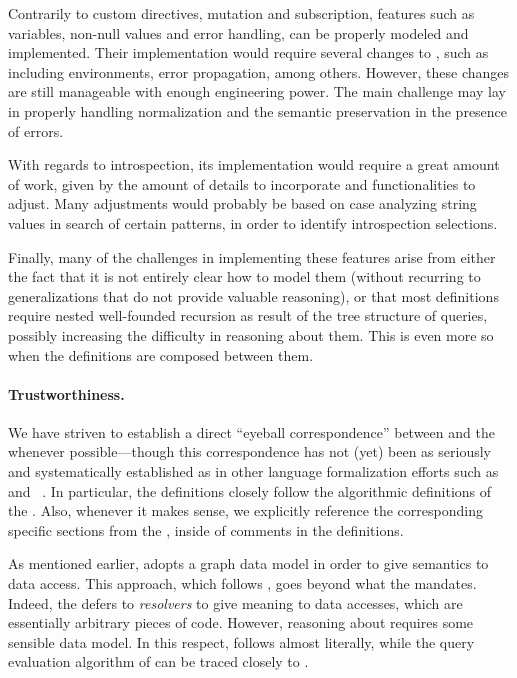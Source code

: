 Contrarily to custom directives, mutation and subscription, features such as variables, non-null values and error handling, can be properly modeled and implemented.
Their implementation would require several changes to \gcoql, such as including environments, error propagation, among others. 
However, these changes are still manageable with enough engineering power. 
The main challenge may lay in properly handling normalization and the semantic preservation in the presence of errors.

With regards to introspection, its implementation would require a great amount of work, given by the amount
of details to incorporate and functionalities to adjust. Many adjustments would probably be based on 
case analyzing string values in search of certain patterns, in order to identify introspection selections.

Finally, many of the challenges in implementing these features arise from either the fact that it is not entirely clear
how to model them (without recurring to generalizations that do not provide valuable reasoning), or that 
most definitions require nested well-founded recursion as result of the tree structure of queries, possibly increasing the
difficulty in reasoning about them. This is even more so when the definitions are composed between them. 



\paragraph{Trustworthiness.}

We have striven to establish a direct ``eyeball correspondence'' between \gcoql and the \spec whenever possible---though this correspondence has not (yet) been as seriously and systematically established as in other language formalization efforts such as \jscert~\cite{jscert} and \coqr~\cite{coqr}. 
In particular, the \gcoql definitions closely follow the algorithmic definitions of the \spec. Also, whenever it makes sense, we explicitly reference the corresponding specific sections from the \spec, inside of comments in the \coq definitions.

As mentioned earlier, \gcoql adopts a graph data model in order to give semantics to data access. This approach, which follows \HP, goes beyond what the \spec mandates. Indeed, the \spec defers to {\em resolvers} to give meaning to data accesses, which are essentially arbitrary pieces of code. However, reasoning about \gql requires some sensible data model. In this respect, \gcoql follows \HP almost literally, while the query evaluation algorithm of \gcoql can be traced closely to \spec.

